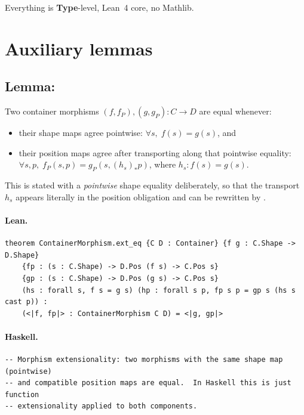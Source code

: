 \documentclass[11pt,a4paper]{article}
\begin{document}
Everything is \textbf{Type}-level, Lean~4 core, no Mathlib.

\section{Auxiliary lemmas}

\subsection{Lemma: }

\begin{prop}
Two container morphisms $(f, f_P), (g, g_P) : C \to D$ are equal whenever:
\begin{itemize}
  \item their shape maps agree pointwise: $\forall s,\; f(s) = g(s)$, and
  \item their position maps agree after transporting along that pointwise
    equality: $\forall s, p,\; f_P(s, p) = g_P(s, (h_s)_* p)$,
    where $h_s : f(s) = g(s)$.
\end{itemize}
This is stated with a \emph{pointwise} shape equality deliberately, so that
the transport $h_s$ appears literally in the position obligation and can be
rewritten by .
\end{prop}

\paragraph{Lean.}
\begin{lstlisting}[style=lean]
theorem ContainerMorphism.ext_eq {C D : Container} {f g : C.Shape -> D.Shape}
    {fp : (s : C.Shape) -> D.Pos (f s) -> C.Pos s}
    {gp : (s : C.Shape) -> D.Pos (g s) -> C.Pos s}
    (hs : forall s, f s = g s) (hp : forall s p, fp s p = gp s (hs s cast p)) :
    (<|f, fp|> : ContainerMorphism C D) = <|g, gp|>
\end{lstlisting}

\paragraph{Haskell.}
\begin{lstlisting}[style=haskell]
-- Morphism extensionality: two morphisms with the same shape map (pointwise)
-- and compatible position maps are equal.  In Haskell this is just function
-- extensionality applied to both components.
\end{lstlisting}
\end{document}
